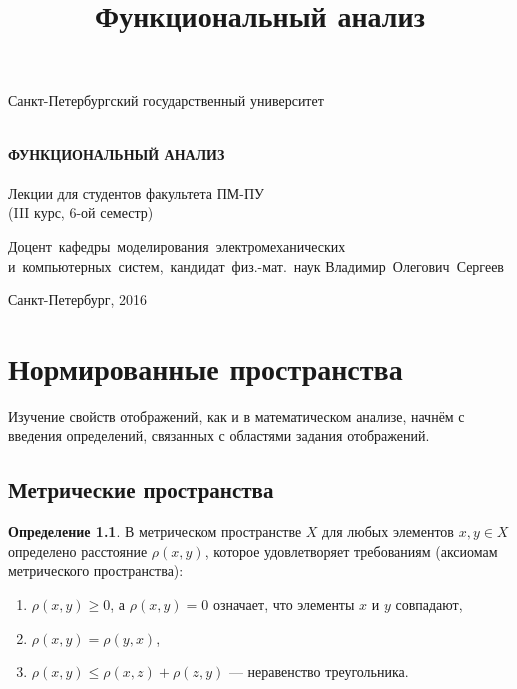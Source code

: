 \documentclass[12pt,a4paper,titlepage, oneside]{book}
\title{Функциональный анализ}
\theoremstyle{definition}
\newtheorem*{definition}{Определение}
\theoremstyle{plain}
\theoremstyle{remark}
\theoremstyle{remark}
\theoremstyle{remark}
\theoremstyle{remark}
\theoremstyle{plain}
\theoremstyle{plain}
\begin{document}
\begin{titlepage}

\begin{center}
\vfill

Санкт-Петербургский государственный университет\\
\ \\

\vfill

{\large\bf ФУНКЦИОНАЛЬНЫЙ АНАЛИЗ\\}
\ \\
Лекции для студентов факультета ПМ-ПУ\\
(III курс, 6-ой семестр)

\vfill

\hfill\vbox
{
\hbox{Доцент кафедры моделирования электромеханических}
\hbox{и компьютерных систем, кандидат физ.-мат. наук}
\hbox{Владимир Олегович Сергеев}
}

\vfill

Санкт-Петербург, 2016
\end{center}

\end{titlepage}

\tableofcontents

\chapter{Нормированные пространства}

Изучение свойств отображений, как и в математическом анализе, начнём с введения определений, связанных с областями задания отображений.

\section{Метрические пространства}

\begin{definition}
В метрическом пространстве $X$ для любых элементов $x, y \in X$ определено расстояние $\rho(x, y)$, которое удовлетворяет требованиям (аксиомам метрического пространства):
\begin{enumerate}

	\item $\rho(x, y)\geqslant 0$, а $\rho(x, y)=0$ означает, что элементы $x$ и $y$ совпадают,

	\item $\rho(x, y)=\rho(y, x)$,

	\item $ \rho(x, y)\leqslant \rho(x, z) +\rho(z, y)$ --- неравенство треугольника.
	
\end{enumerate}
\end{definition}
\end{document}
